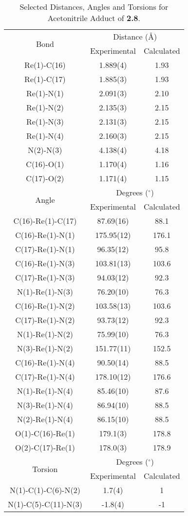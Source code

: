 \begin{table}[htbp]
  \centering
  \caption{Selected Distances, Angles and Torsions for Acetonitrile Adduct of \textbf{2.8}.}
    \begin{tabular}{ccc}
    \toprule
	\multirow{2}{*}{Bond} & \multicolumn{2}{c}{Distance (\r{A})} \\ \cline{2-3}
     & Experimental & Calculated \\ \midrule
    Re(1)-C(16) & 1.889(4) & 1.93 \\
    Re(1)-C(17) & 1.885(3) & 1.93 \\
    Re(1)-N(1) & 2.091(3) & 2.10 \\
    Re(1)-N(2) & 2.135(3) & 2.15 \\
    Re(1)-N(3) & 2.131(3) & 2.15 \\
    Re(1)-N(4) & 2.160(3) & 2.15 \\ 
    N(2)-N(3) & 4.138(4) & 4.18 \\ 
    C(16)-O(1) & 1.170(4) & 1.16 \\
    C(17)-O(2) & 1.171(4) & 1.15 \\ \midrule
	\multirow{2}{*}{Angle} & \multicolumn{2}{c}{Degrees ($^\circ$)} \\ \cline{2-3}
     & Experimental & Calculated \\ \midrule
    C(16)-Re(1)-C(17) & 87.69(16) & 88.1 \\
    C(16)-Re(1)-N(1) & 175.95(12) & 176.1 \\
    C(17)-Re(1)-N(1) & 96.35(12) & 95.8 \\
    C(16)-Re(1)-N(3) & 103.81(13) & 103.6 \\
    C(17)-Re(1)-N(3) & 94.03(12) & 92.3 \\
    N(1)-Re(1)-N(3) & 76.20(10) & 76.3 \\
    C(16)-Re(1)-N(2) & 103.58(13) & 103.6 \\
    C(17)-Re(1)-N(2) & 93.73(12) & 92.3 \\
    N(1)-Re(1)-N(2) & 75.99(10) & 76.3 \\
    N(3)-Re(1)-N(2) & 151.77(11) & 152.5 \\
    C(16)-Re(1)-N(4) & 90.50(14) & 88.5 \\
    C(17)-Re(1)-N(4) & 178.10(12) & 176.6 \\
    N(1)-Re(1)-N(4) & 85.46(10) & 87.6 \\
    N(3)-Re(1)-N(4) & 86.94(10) & 88.5 \\
    N(2)-Re(1)-N(4) & 86.15(10) & 88.5 \\
    O(1)-C(16)-Re(1) & 179.1(3) & 178.8 \\
    O(2)-C(17)-Re(1) & 178.0(3) & 178.9 \\\midrule
    \multirow{2}{*}{Torsion} & \multicolumn{2}{c}{Degrees ($^\circ$)} \\ \cline{2-3}
     & Experimental & Calculated \\ \midrule
    N(1)-C(1)-C(6)-N(2) & 1.7(4) & 1 \\
    N(1)-C(5)-C(11)-N(3) & -1.8(4) & -1 \\
    \bottomrule
    \end{tabular}%
  \label{tab.da8}%
\end{table}%
